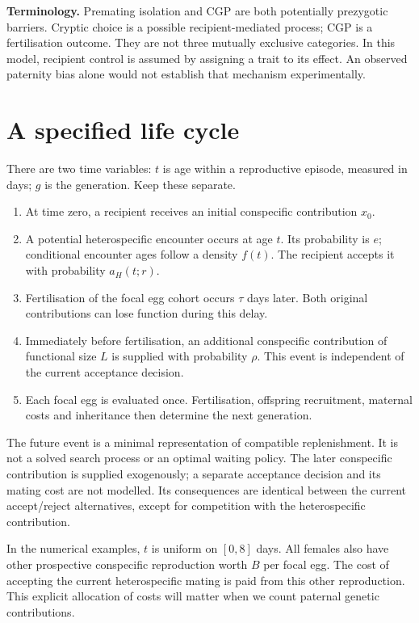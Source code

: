 \documentclass[11pt,a4paper]{article}
\begin{document}
\textbf{Terminology.} Premating isolation and CGP are both potentially prezygotic barriers. Cryptic choice is a possible recipient-mediated process; CGP is a fertilisation outcome. They are not three mutually exclusive categories. In this model, recipient control is assumed by assigning a trait to its effect. An observed paternity bias alone would not establish that mechanism experimentally.

\section{A specified life cycle}
There are two time variables: $t$ is age within a reproductive episode, measured in days; $g$ is the generation. Keep these separate.
\begin{enumerate}
\item At time zero, a recipient receives an initial conspecific contribution $x_0$.
\item A potential heterospecific encounter occurs at age $t$. Its probability is $e$; conditional encounter ages follow a density $f(t)$. The recipient accepts it with probability $a_H(t;r)$.
\item Fertilisation of the focal egg cohort occurs $\tau$ days later. Both original contributions can lose function during this delay.
\item Immediately before fertilisation, an additional conspecific contribution of functional size $L$ is supplied with probability $\rho$. This event is independent of the current acceptance decision.
\item Each focal egg is evaluated once. Fertilisation, offspring recruitment, maternal costs and inheritance then determine the next generation.
\end{enumerate}
The future event is a minimal representation of compatible replenishment. It is not a solved search process or an optimal waiting policy. The later conspecific contribution is supplied exogenously; a separate acceptance decision and its mating cost are not modelled. Its consequences are identical between the current accept/reject alternatives, except for competition with the heterospecific contribution.

In the numerical examples, $t$ is uniform on $[0,8]$ days. All females also have other prospective conspecific reproduction worth $B$ per focal egg. The cost of accepting the current heterospecific mating is paid from this other reproduction. This explicit allocation of costs will matter when we count paternal genetic contributions.
\end{document}
